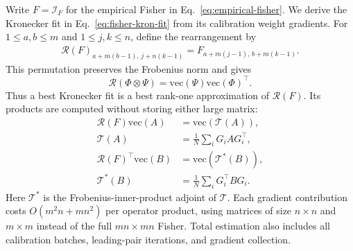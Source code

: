 Write $F=\mathcal I_F$ for the empirical Fisher in Eq.~\eqref{eq:empirical-fisher}. We derive the Kronecker fit in Eq.~\eqref{eq:fisher-kron-fit} from its calibration weight gradients.
For $1\le a,b\le m$ and $1\le j,k\le n$, define the rearrangement by
\begin{equation}
\begin{aligned}
\mathcal R(F)_{a+m(b-1),\,j+n(k-1)}
=F_{a+m(j-1),\,b+m(k-1)}.
\end{aligned}
\end{equation}
This permutation preserves the Frobenius norm and gives
\begin{equation}
\mathcal R(\Phi\otimes\Psi)
=\mathrm{vec}(\Psi)\mathrm{vec}(\Phi)^\top.
\end{equation}
Thus a best Kronecker fit is a best rank-one approximation of $\mathcal R(F)$. Its products are computed without storing either large matrix:
\begin{equation}
\begin{aligned}
\mathcal R(F)\mathrm{vec}(A)&=\mathrm{vec}(\mathcal T(A)),\\
\mathcal T(A)&=\frac1N\sum_iG_iAG_i^\top,\\
\mathcal R(F)^\top\mathrm{vec}(B)&=\mathrm{vec}(\mathcal T^*(B)),\\
\mathcal T^*(B)&=\frac1N\sum_iG_i^\top BG_i.
\end{aligned}
\label{eq:sup-fisher-operators}
\end{equation}
Here $\mathcal T^*$ is the Frobenius-inner-product adjoint of $\mathcal T$. Each gradient contribution costs $O(m^2n+mn^2)$ per operator product, using matrices of size $n\times n$ and $m\times m$ instead of the full $mn\times mn$ Fisher. Total estimation also includes all calibration batches, leading-pair iterations, and gradient collection.

